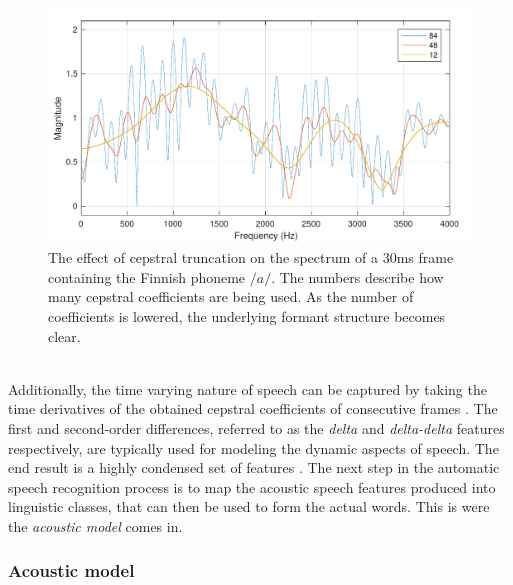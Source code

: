 \documentclass[english, 12pt, a4paper, pdftex, elec, utf8]{aaltothesis}
\begin{document}
\begin{figure}[h]
	\centering
	\includegraphics[trim={0.1cm 0cm 0cm 0cm}, clip, width=\textwidth]{cepstrum.pdf}
	\caption{The effect of cepstral truncation on the spectrum of a 30ms frame containing the Finnish phoneme $/a/$. The numbers describe how many cepstral coefficients are being used. As the number of coefficients is lowered, the underlying formant structure becomes clear.}
	\label{fig:cepstrum} 
\end{figure} \\
Additionally, the time varying nature of speech can be captured by taking the time derivatives of the obtained cepstral coefficients of consecutive frames \cite{gales2008application, kallasjoki2016}. The first and second-order differences, referred to as the \textit{delta} and \textit{delta-delta} features respectively, are typically used for modeling the dynamic aspects of speech. The end result is a highly condensed set of features \cite{huang2001spoken, gales2008application}. The next step in the automatic speech recognition process is to map the acoustic speech features produced into linguistic classes, that can then be used to form the actual words. This is were the \textit{acoustic model} comes in.

\subsubsection{Acoustic model}
\end{document}
